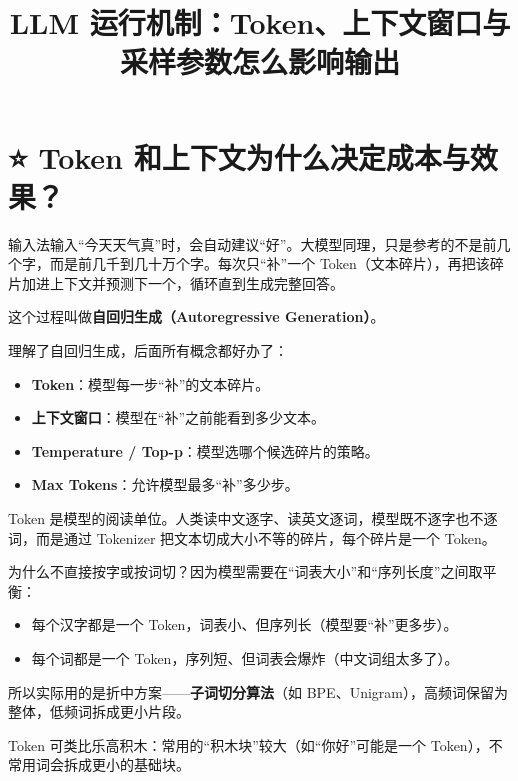 \documentclass[9pt,a4paper,twocolumn]{ctexart}
\begin{document}
\title{LLM 运行机制：Token、上下文窗口与采样参数怎么影响输出}
\date{}
\maketitle
{}

\section*{⭐️ Token 和上下文为什么决定成本与效果？}


输入法输入“今天天气真”时，会自动建议“好”。大模型同理，只是参考的不是前几个字，而是前几千到几十万个字。每次只“补”一个 Token（文本碎片），再把该碎片加进上下文并预测下一个，循环直到生成完整回答。



这个过程叫做\textbf{自回归生成（Autoregressive Generation）}。



理解了自回归生成，后面所有概念都好办了：


\begin{itemize}[itemsep=1pt, topsep=2pt]
  \item \textbf{Token}：模型每一步“补”的文本碎片。
  \item \textbf{上下文窗口}：模型在“补”之前能看到多少文本。
  \item \textbf{Temperature / Top-p}：模型选哪个候选碎片的策略。
  \item \textbf{Max Tokens}：允许模型最多“补”多少步。
\end{itemize}


Token 是模型的阅读单位。人类读中文逐字、读英文逐词，模型既不逐字也不逐词，而是通过 Tokenizer 把文本切成大小不等的碎片，每个碎片是一个 Token。



为什么不直接按字或按词切？因为模型需要在“词表大小”和“序列长度”之间取平衡：


\begin{itemize}[itemsep=1pt, topsep=2pt]
  \item 每个汉字都是一个 Token，词表小、但序列长（模型要“补”更多步）。
  \item 每个词都是一个 Token，序列短、但词表会爆炸（中文词组太多了）。
\end{itemize}


所以实际用的是折中方案——\textbf{子词切分算法}（如 BPE、Unigram），高频词保留为整体，低频词拆成更小片段。



Token 可类比乐高积木：常用的“积木块”较大（如“你好”可能是一个 Token），不常用词会拆成更小的基础块。
\end{document}
